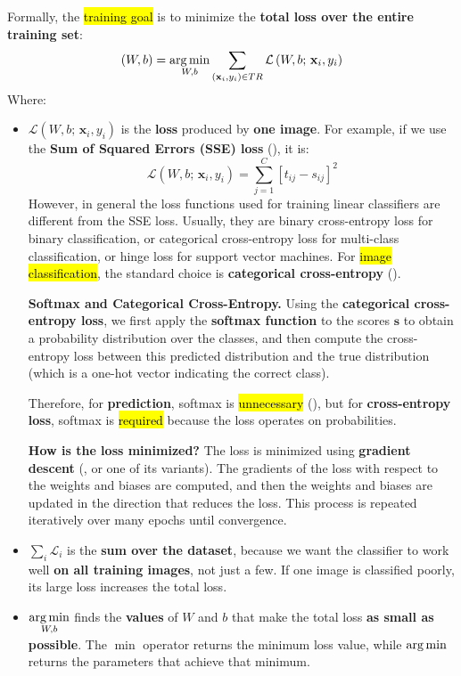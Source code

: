 \highspace
Formally, the \hl{training goal} is to minimize the \textbf{total loss over the entire training set}:
\begin{equation}
    \left(W,b\right) = \operatorname*{arg\,min}_{W,b} \sum_{\left(\mathbf{x}_{i}, y_{i}\right) \in TR} \mathcal{L}\left( W, b; \, \mathbf{x}_{i}, y_{i} \right)
\end{equation}
Where:
\begin{itemize}
    \item $\mathcal{L}\left( W, b; \, \mathbf{x}_{i}, y_{i} \right)$ is the \textbf{loss} produced by \textbf{one image}. For example, if we use the \textbf{Sum of Squared Errors (SSE) loss} (), it is:
    \begin{equation*}
        \mathcal{L}\left( W, b; \, \mathbf{x}_{i}, y_{i} \right) = \sum_{j=1}^{C} \left[ t_{ij} - s_{ij} \right]^{2}
    \end{equation*}
    However, in general the loss functions used for training linear classifiers are different from the SSE loss. Usually, they are binary cross-entropy loss for binary classification, or categorical cross-entropy loss for multi-class classification, or hinge loss for support vector machines. For \hl{image classification}, the standard choice is \textbf{categorical cross-entropy} ().

    \textcolor{Red2}{ \textbf{Softmax and Categorical Cross-Entropy.}} Using the \textbf{categorical cross-entropy loss}, we first apply the \textbf{softmax function} to the scores $\mathbf{s}$ to obtain a probability distribution over the classes, and then compute the cross-entropy loss between this predicted distribution and the true distribution (which is a one-hot vector indicating the correct class).

    Therefore, for \textbf{prediction}, softmax is \hl{unnecessary} (), but for \textbf{cross-entropy loss}, softmax is \hl{required} because the loss operates on probabilities.

    \textcolor{Green3}{ \textbf{How is the loss minimized?}} The loss is minimized using \textbf{gradient descent} (, or one of its variants). The gradients of the loss with respect to the weights and biases are computed, and then the weights and biases are updated in the direction that reduces the loss. This process is repeated iteratively over many epochs until convergence.


    \item $\displaystyle\sum_{i} \mathcal{L}_{i}$ is the \textbf{sum over the dataset}, because we want the classifier to work well \textbf{on all training images}, not just a few. If one image is classified poorly, its large loss increases the total loss.


    \item $\displaystyle\operatorname*{arg\,min}_{W,b}$ finds the \textbf{values} of $W$ and $b$ that make the total loss \textbf{as small as possible}. The $\min$ operator returns the minimum loss value, while $\operatorname*{arg\,min}$ returns the parameters that achieve that minimum.
\end{itemize}

